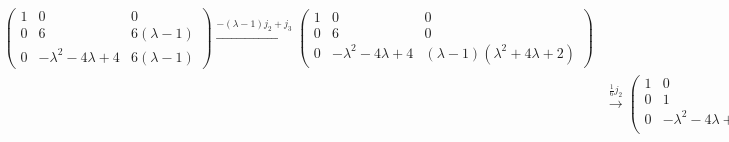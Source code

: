 \documentclass[../../main.tex]{subfiles}
\begin{document}
\begin{solution}
\begin{align*}
\begin{pmatrix}
1 & 0 & 0 \\
0 & 6 & 6(\lambda - 1) \\
0 & -\lambda^2 - 4\lambda + 4 & 6(\lambda - 1)
\end{pmatrix}
\xrightarrow{-(\lambda-1)j_2+j_3}
\begin{pmatrix}
1 & 0 & 0 \\
0 & 6 & 0 \\
0 & -\lambda^2 - 4\lambda + 4 & (\lambda - 1)(\lambda^2 + 4\lambda + 2)
\end{pmatrix}\\
&\xrightarrow{\frac{1}{6}j_2}
\begin{pmatrix}
1 & 0 & 0 \\
0 & 1 & 0 \\
0 & -\lambda^2 - 4\lambda + 4 & (\lambda - 1)(\lambda^2 + 4\lambda + 2)
\end{pmatrix}
\xrightarrow{-(-\lambda^2 - 4\lambda + 4)r_2+r_3}
\begin{pmatrix}
1 & 0 & 0 \\
0 & 1 & 0 \\
0 & 0 & (\lambda - 1)(\lambda^2 + 4\lambda + 2)
\end{pmatrix}.
\end{align*} 
\end{solution}
\end{document}
